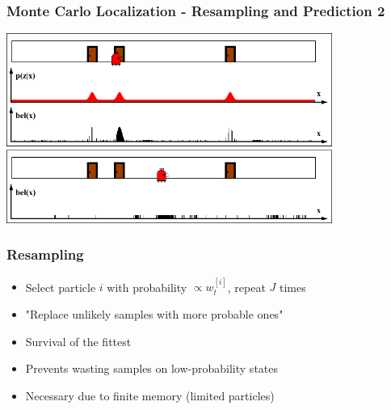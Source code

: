 \begin{frame}
    \frametitle{Monte Carlo Localization - Resampling and Prediction 2}
    
    \begin{center} 
        \includegraphics[width=0.8\textwidth]{./images/particle_filter/monte_carlo_resample_and_predict2.pdf} 
    \end{center}
    
\end{frame}

\begin{frame}
    \frametitle{Resampling}

    \begin{itemize}
        \item Select particle $i$ with probability $\propto w_t^{[i]}$, repeat $J$ times
        \item "Replace unlikely samples with more probable ones"
        \item Survival of the fittest
        \item Prevents wasting samples on low-probability states
        \item Necessary due to finite memory (limited particles)
    \end{itemize}
\end{frame}

